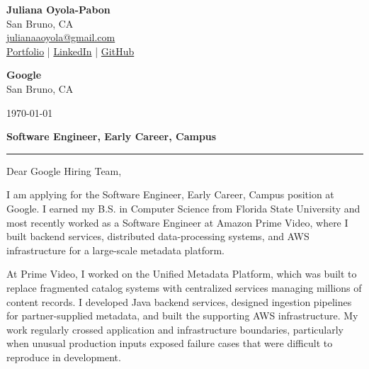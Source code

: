 \documentclass[10pt,letterpaper]{article}
\newcommand{\company}{Google}
\newcommand{\position}{Software Engineer, Early Career, Campus}
\newcommand{\companylocation}{San Bruno, CA}
\begin{document}

{\small
\textbf{Juliana Oyola-Pabon}\\
San Bruno, CA\\
\href{mailto:julianaaoyola@gmail.com}{julianaaoyola@gmail.com}\\
\href{https://juliana-portfolio-two.vercel.app/}{Portfolio}
\enspace|\enspace
\href{https://linkedin.com/in/julianaoyola}{LinkedIn}
\enspace|\enspace
\href{https://github.com/julsoyola}{GitHub}
}

\vspace{22pt}


\textbf{\company}\\
\companylocation

\vspace{4pt}

\today

\vspace{28pt}


{\large\bfseries \position}

\vspace{5pt}

{\color{Rule}\rule{\textwidth}{0.6pt}}

\vspace{20pt}


Dear Google Hiring Team,

I am applying for the Software Engineer, Early Career, Campus position at
Google. I earned my B.S. in Computer Science from Florida State University
and most recently worked as a Software Engineer at Amazon Prime Video, where
I built backend services, distributed data-processing systems, and AWS
infrastructure for a large-scale metadata platform.

At Prime Video, I worked on the Unified Metadata Platform, which was built to
replace fragmented catalog systems with centralized services managing millions
of content records. I developed Java backend services, designed ingestion
pipelines for partner-supplied metadata, and built the supporting AWS
infrastructure. My work regularly crossed application and infrastructure
boundaries, particularly when unusual production inputs exposed failure cases
that were difficult to reproduce in development.
\end{document}
